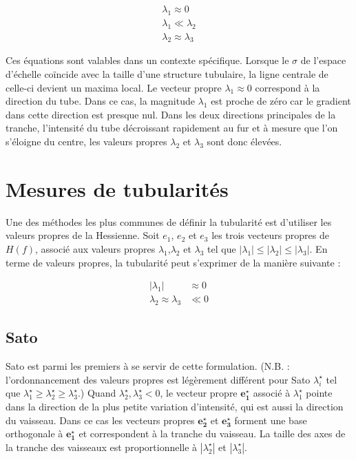 \begin{align}
  \lambda_1 \approx 0 \\
  \lambda_1 \ll \lambda_2 \\
  \lambda_2 \approx \lambda_3
\end{align}

Ces équations sont valables dans un contexte spécifique. Lorsque le $\sigma$ de l'espace d'échelle coïncide avec la taille d'une structure tubulaire, la ligne centrale de celle-ci devient un maxima local. Le vecteur propre $\lambda_1 \approx 0$ correspond à la direction du tube. Dans ce cas, la magnitude $\lambda_1$ est proche de zéro car le gradient dans cette direction est presque nul. Dans les deux directions principales de la tranche, l'intensité du tube décroissant rapidement au fur et à mesure que l'on s'éloigne du centre, les valeurs propres $\lambda_2$ et $\lambda_3$ sont donc élevées.


\section{Mesures de tubularités}

Une des méthodes les plus communes de définir la tubularité est d'utiliser les valeurs propres de la Hessienne. Soit $e_1$, $e_2$ et $e_3$ les trois vecteurs propres de $H(f)$, associé aux valeurs propres $\lambda_1$,$\lambda_2$ et $\lambda_3$ tel que $|\lambda_1| \leqslant |\lambda_2| \leqslant |\lambda_3|$. En terme de valeurs propres, la tubularité peut s'exprimer de la manière suivante \cite{Lorenz1997_multi}:

\begin{align}
\nonumber
  |\lambda_1| & \approx 0 \\
\nonumber
  \lambda_2 \approx \lambda_3 & \ll 0
\end{align}

\subsection{Sato}

Sato \etal \cite{Sato1998_vesselness} est parmi les premiers à se servir de cette formulation. (N.B. : l'ordonnancement des valeurs propres est légèrement différent pour Sato $\lambda^\star_i$ tel que $\lambda^\star_1 \geqslant \lambda^\star_2  \geqslant  \lambda^\star_3$.)
Quand $\lambda^\star_2, \lambda^\star_3 < 0$, le vecteur propre $\mathbf {e^\star_1}$ associé à $\lambda^\star_1$ pointe dans la direction de la plus petite variation d'intensité, qui est aussi la direction du vaisseau.
Dans ce cas les vecteurs propres $\mathbf {e^\star_2}$ et $\mathbf {e^\star_3}$ forment une base orthogonale à $\mathbf {e^\star_1}$ et correspondent à la tranche du vaisseau.
La taille des axes de la tranche des vaisseaux est proportionnelle à $|\lambda^\star_2|$ et $|\lambda^\star_3|$.

